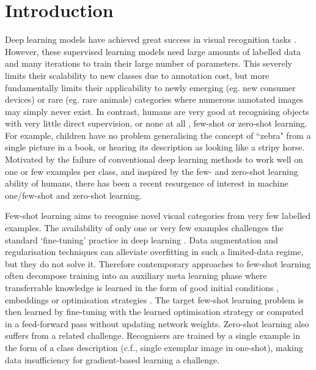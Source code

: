 \documentclass[10pt,twocolumn,letterpaper]{article}
\begin{document}
\section{Introduction}
Deep learning models have achieved great success in visual recognition tasks \cite{krizhevsky2012imagenet, he2016deep, simonyan2014very}. However, these supervised learning models need large amounts of labelled data and many iterations to train their large number of parameters. This severely limits their scalability to new classes due to annotation cost, but more fundamentally limits their applicability to newly emerging (eg. new consumer devices) or rare (eg. rare animals) categories where numerous annotated images may simply never exist. In contrast, humans are very good at recognising objects with very little direct supervision, or none at all , few-shot  \cite{lake2011one, fei2006one} or zero-shot  \cite{lampert2014attribute} learning. For example, children have no problem generalising the concept of ``zebra" from a single picture in a book, or hearing its description as looking like a stripy horse. Motivated by the failure of conventional deep learning methods to work well on one or few examples per class, and inspired by the few- and zero-shot learning ability of humans, there has been a recent resurgence of interest in machine one/few-shot \cite{edwards2016towards, vinyals2016matching, santoro2016meta, kaiser2017learning, koch2015siamese, finn2017model, munkhdalai2017meta, snell2017prototypical, ravi2016optimization} and zero-shot \cite{frome2013devise,akata2015evaluation,lampert2014attribute,zhang2017learning,lei2015predicting,romera2015embarrassingly} learning.

Few-shot learning aims to recognise novel visual categories from very few labelled examples. The availability of only one or very few examples challenges the standard `fine-tuning' practice in deep learning \cite{finn2017model}. Data augmentation and regularisation techniques can alleviate overfitting in such a limited-data regime, but they do not solve it. Therefore contemporary approaches to few-shot learning often decompose training into an auxiliary meta learning phase where transferrable knowledge is learned in the form of good initial conditions \cite{finn2017model}, embeddings \cite{snell2017prototypical,vinyals2016matching} or optimisation strategies \cite{ravi2016optimization}. The target few-shot learning problem is then learned by fine-tuning \cite{finn2017model} with the learned optimisation strategy \cite{ravi2016optimization} or computed in a feed-forward pass \cite{snell2017prototypical,vinyals2016matching,bertinetto2016feedForwardOneShot,santoro2016meta} without updating network weights. Zero-shot learning also suffers from a related challenge. Recognisers are trained by a single example in the form of a class description (c.f., single exemplar image in one-shot), making data insufficiency for gradient-based learning a challenge.
\end{document}
